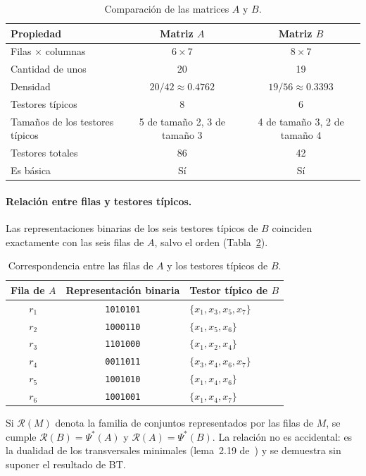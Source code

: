 \documentclass[11pt, a4paper]{article}
\theoremstyle{definition}
\theoremstyle{plain}
\newcommand{\Psis}{\Psi^{*}}
\newcommand{\x}[1]{x_{#1}}
\newcommand{\cj}[1]{\{#1\}}
\begin{document}
\begin{table}[htbp]
\centering
\small
\begin{tabular}{lcc}
\toprule
Propiedad & Matriz $A$ & Matriz $B$ \\
\midrule
Filas $\times$ columnas & $6\times7$ & $8\times7$ \\
Cantidad de unos & 20 & 19 \\
Densidad & $20/42\approx0.4762$ & $19/56\approx0.3393$ \\
Testores típicos & 8 & 6 \\
Tamaños de los testores típicos & 5 de tamaño 2, 3 de tamaño 3 & 4 de tamaño 3, 2 de tamaño 4 \\
Testores totales & 86 & 42 \\
Es básica & Sí & Sí \\
\bottomrule
\end{tabular}
\caption{Comparación de las matrices $A$ y $B$.}
\label{tab:comparacion-A-B}
\end{table}

\paragraph{Relación entre filas y testores típicos.} Las representaciones
binarias de los seis testores típicos de $B$ coinciden exactamente con las seis
filas de $A$, salvo el orden (Tabla~\ref{tab:correspondencia-A-B}).

\begin{table}[htbp]
\centering
\small
\begin{tabular}{ccl}
\toprule
Fila de $A$ & Representación binaria & Testor típico de $B$ \\
\midrule
$r_1$ & \texttt{1010101} & $\cj{\x1,\x3,\x5,\x7}$ \\
$r_2$ & \texttt{1000110} & $\cj{\x1,\x5,\x6}$ \\
$r_3$ & \texttt{1101000} & $\cj{\x1,\x2,\x4}$ \\
$r_4$ & \texttt{0011011} & $\cj{\x3,\x4,\x6,\x7}$ \\
$r_5$ & \texttt{1001010} & $\cj{\x1,\x4,\x6}$ \\
$r_6$ & \texttt{1001001} & $\cj{\x1,\x4,\x7}$ \\
\bottomrule
\end{tabular}
\caption{Correspondencia entre las filas de $A$ y los testores típicos de $B$.}
\label{tab:correspondencia-A-B}
\end{table}

Si $\mathcal R(M)$ denota la familia de conjuntos representados por las filas de
$M$, se cumple $\mathcal R(B)=\Psis(A)$ y $\mathcal R(A)=\Psis(B)$. La relación no
es accidental: es la dualidad de los transversales minimales (lema~2.19
de~\cite{guevara}) y se demuestra sin suponer el resultado de BT.
\end{document}
